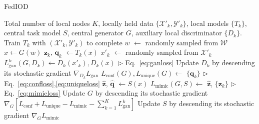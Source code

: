 \documentclass[letterpaper]{article} %
\newcommand{\domw}{\mathcal{W}}
\newcommand{\domx}{\mathcal{X}}
\newcommand{\domy}{\mathcal{Y}}
\begin{document}
\begin{algorithm}[t]
    \caption{FedIOD}
    \label{alg}
 \begin{algorithmic}
     Total number of local nodes $K$, locally held data $\{\domx'_k, \domy'_k\}$, local models $\{T_k\}$, central task model $S$, central generator $G$, auxiliary local discriminator $\{D_k\}$.
    \STATE Train $T_k$  with $(\domx'_k, \domy'_k)$ to complete
    \ENDFOR
    \STATE {\color{gray} {$\Box$ Input distillation }}
    \STATE $w$ $\leftarrow$ randomly sampled from $\domw$ 
    \STATE $x \leftarrow G(w)$
    \STATE $\bm{z}_k$, $\bm{q}_k$ $\leftarrow T_k(x)$ 
    \STATE $x'_k$ $\leftarrow$ randomly sampled from $\domx'_k$
    \STATE $L_\text{gan}^k(G,D_k) \leftarrow D_k(x'_k), D_k(x)$ \hspace*{3em} $\triangleright$  Eq.~\ref{eq:ganloss}
    \STATE Update $D_k$ by descending its stochastic gradient  
    $\nabla_{D_k} L_\text{gan}$
    \ENDFOR
    \STATE $L_\text{conf}(G), L_\text{unique}(G) \leftarrow$ $\{\bm{q}_k\}$  \hspace*{5em}   $\triangleright$  Eq.~\ref{eq:confloss},\ref{eq:uniqueloss}
    \STATE {\color{gray} {$\Box$ Output distillation }}
    \STATE  $\hat{\bm{z}}$, $\hat{\bm{q}}$ $\leftarrow S(x)$ 
    \STATE $L_\text{mimic}(G, S) \leftarrow$  $\hat{\bm{z}}$, $\{\bm{z}_k\}$   \hspace*{6.7em}   $\triangleright$  Eq.~\ref{eq:mimicloss}
    \STATE {\color{gray} {$\Box$ Update }}
    \STATE Update $G$ by descending its stochastic gradient  
    $\nabla_{G} [ L_\text{conf} +  L_\text{unique} - L_\text{mimic} - \sum_{k=1}^K L_\text{gan}^k ]$
    \STATE Update $S$ by descending its stochastic gradient  
    $\nabla_{G} L_\text{mimic}$
    \ENDFOR
\end{algorithmic}
\end{algorithm}
\end{document}
